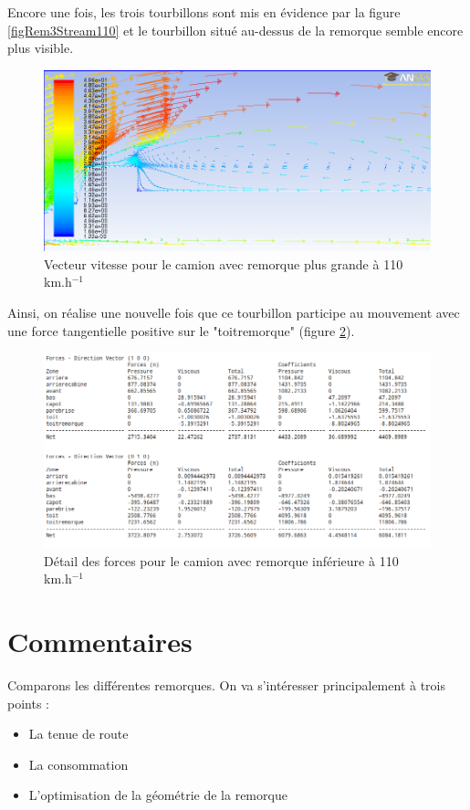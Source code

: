 Encore une fois, les trois tourbillons sont mis en évidence par la figure \ref{figRem3Stream110} et le tourbillon situé au-dessus de la remorque semble encore plus visible.
\begin{figure}[!h]
\centering
\includegraphics[scale=0.4]{resultsCx/rem3_vectvitesse.png}
\caption{Vecteur vitesse pour le camion avec remorque plus grande à 110 km.h$^{-1}$}
\label{figRem3Vit110}
\end{figure}

Ainsi, on réalise une nouvelle fois que ce tourbillon participe au mouvement avec une force tangentielle positive sur le "toitremorque" (figure \ref{resultantesForces3}).
\begin{figure}[!h]
\centering
\includegraphics[scale=0.4]{resultsCx/force-rem3.png}
\caption{Détail des forces pour le camion avec remorque inférieure à 110 km.h$^{-1}$}
\label{resultantesForces3}
\end{figure}

\clearpage

\section{Commentaires}
Comparons les différentes remorques. On va s'intéresser principalement à trois points :
\begin{itemize}
	\item La tenue de route
	\item La consommation
	\item L'optimisation de la géométrie de la remorque
\end{itemize}

